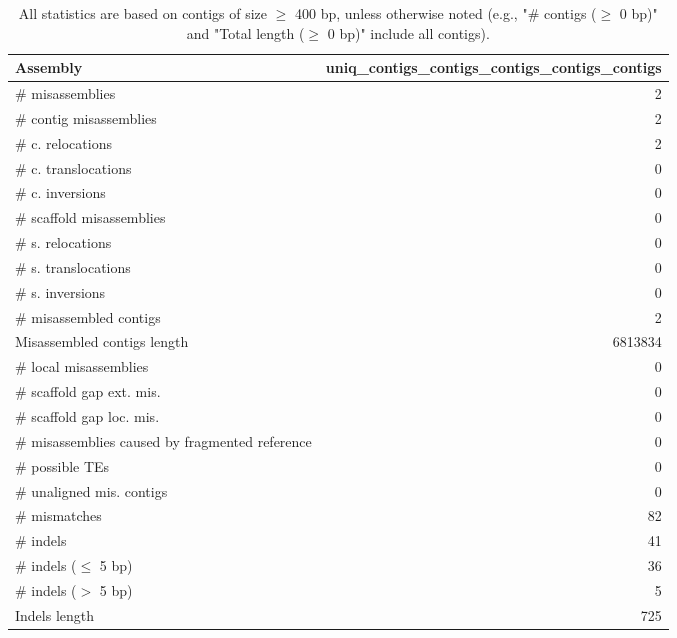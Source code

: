 \documentclass[12pt,a4paper]{article}
\begin{document}
\begin{table}[ht]
\begin{center}
\caption{All statistics are based on contigs of size $\geq$ 400 bp, unless otherwise noted (e.g., "\# contigs ($\geq$ 0 bp)" and "Total length ($\geq$ 0 bp)" include all contigs).}
\begin{tabular}{|l*{1}{|r}|}
\hline
Assembly & uniq\_contigs\_contigs\_contigs\_contigs\_contigs \\ \hline
\# misassemblies & 2 \\ \hline
\hspace{2mm}\# contig misassemblies & 2 \\ \hline
\hspace{5mm}\# c. relocations & 2 \\ \hline
\hspace{5mm}\# c. translocations & 0 \\ \hline
\hspace{5mm}\# c. inversions & 0 \\ \hline
\hspace{2mm}\# scaffold misassemblies & 0 \\ \hline
\hspace{5mm}\# s. relocations & 0 \\ \hline
\hspace{5mm}\# s. translocations & 0 \\ \hline
\hspace{5mm}\# s. inversions & 0 \\ \hline
\# misassembled contigs & 2 \\ \hline
Misassembled contigs length & 6813834 \\ \hline
\# local misassemblies & 0 \\ \hline
\# scaffold gap ext. mis. & 0 \\ \hline
\# scaffold gap loc. mis. & 0 \\ \hline
\# misassemblies caused by fragmented reference & 0 \\ \hline
\# possible TEs & 0 \\ \hline
\# unaligned mis. contigs & 0 \\ \hline
\# mismatches & 82 \\ \hline
\# indels & 41 \\ \hline
\hspace{5mm}\# indels ($\leq$ 5 bp) & 36 \\ \hline
\hspace{5mm}\# indels ($>$ 5 bp) & 5 \\ \hline
Indels length & 725 \\ \hline
\end{tabular}
\end{center}
\end{table}
\end{document}
